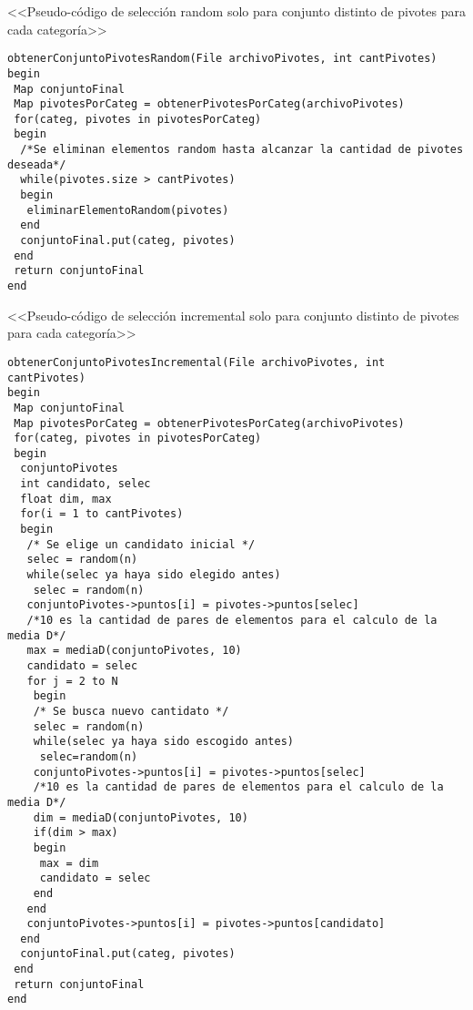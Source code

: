 <<Pseudo-c\'odigo de selecci\'on random solo para conjunto distinto de pivotes para cada categor\'ia>>
\begin{lstlisting}
obtenerConjuntoPivotesRandom(File archivoPivotes, int cantPivotes)
begin
 Map conjuntoFinal
 Map pivotesPorCateg = obtenerPivotesPorCateg(archivoPivotes)
 for(categ, pivotes in pivotesPorCateg)
 begin
  /*Se eliminan elementos random hasta alcanzar la cantidad de pivotes deseada*/
  while(pivotes.size > cantPivotes)
  begin
   eliminarElementoRandom(pivotes)
  end
  conjuntoFinal.put(categ, pivotes)
 end
 return conjuntoFinal
end
\end{lstlisting}
<<Pseudo-c\'odigo de selecci\'on incremental solo para conjunto distinto de pivotes para cada categor\'ia>>
\begin{lstlisting}
obtenerConjuntoPivotesIncremental(File archivoPivotes, int cantPivotes)
begin
 Map conjuntoFinal
 Map pivotesPorCateg = obtenerPivotesPorCateg(archivoPivotes)
 for(categ, pivotes in pivotesPorCateg)
 begin
  conjuntoPivotes
  int candidato, selec
  float dim, max
  for(i = 1 to cantPivotes)
  begin
   /* Se elige un candidato inicial */ 
   selec = random(n)
   while(selec ya haya sido elegido antes)
    selec = random(n)
   conjuntoPivotes->puntos[i] = pivotes->puntos[selec]
   /*10 es la cantidad de pares de elementos para el calculo de la media D*/
   max = mediaD(conjuntoPivotes, 10)
   candidato = selec
   for j = 2 to N
    begin
    /* Se busca nuevo cantidato */
    selec = random(n)
    while(selec ya haya sido escogido antes)
     selec=random(n)
    conjuntoPivotes->puntos[i] = pivotes->puntos[selec]
    /*10 es la cantidad de pares de elementos para el calculo de la media D*/
    dim = mediaD(conjuntoPivotes, 10)
    if(dim > max)
    begin
     max = dim
     candidato = selec
    end
   end
   conjuntoPivotes->puntos[i] = pivotes->puntos[candidato]
  end
  conjuntoFinal.put(categ, pivotes)
 end
 return conjuntoFinal
end
\end{lstlisting}

